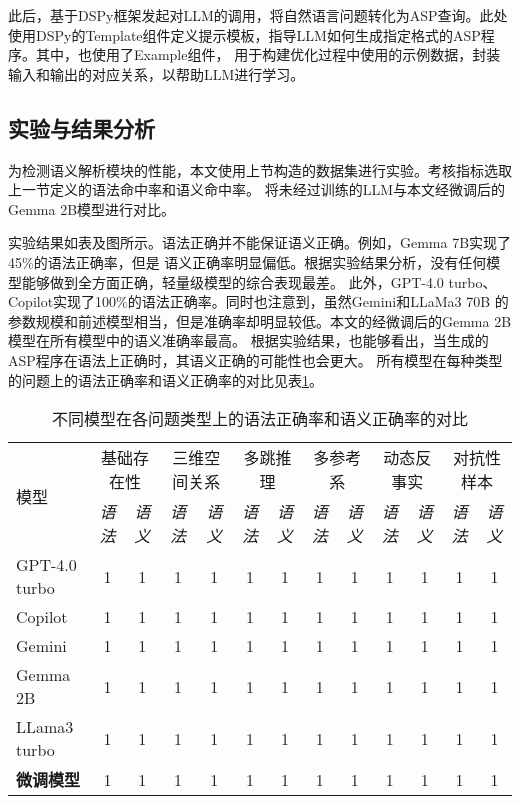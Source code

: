 此后，基于DSPy框架发起对LLM的调用，将自然语言问题转化为ASP查询。此处使用DSPy的Template组件定义提示模板，指导LLM如何生成指定格式的ASP程序。其中，也使用了Example组件，
用于构建优化过程中使用的示例数据，封装输入和输出的对应关系，以帮助LLM进行学习。

\subsection{实验与结果分析}
为检测语义解析模块的性能，本文使用上节构造的数据集进行实验。考核指标选取上一节定义的语法命中率和语义命中率。
将未经过训练的LLM与本文经微调后的Gemma 2B模型进行对比。

实验结果如表及图所示。语法正确并不能保证语义正确。例如，Gemma 7B实现了45\%的语法正确率，但是
语义正确率明显偏低。根据实验结果分析，没有任何模型能够做到全方面正确，轻量级模型的综合表现最差。
此外，GPT-4.0 turbo、Copilot实现了100\%的语法正确率。同时也注意到，虽然Gemini和LLaMa3 70B
的参数规模和前述模型相当，但是准确率却明显较低。本文的经微调后的Gemma 2B模型在所有模型中的语义准确率最高。
根据实验结果，也能够看出，当生成的ASP程序在语法上正确时，其语义正确的可能性也会更大。
所有模型在每种类型的问题上的语法正确率和语义正确率的对比见表\ref{tab:semantics_comparison}。

\begin{table}[h]
    \centering
    \renewcommand{\arraystretch}{1.2}
    \setlength{\tabcolsep}{5pt}
    \begin{tabular}{lcccccccccccc}
        \toprule
        \multirow{2}{*}{模型} & \multicolumn{2}{c}{基础存在性} & \multicolumn{2}{c}{三维空间关系} & \multicolumn{2}{c}{多跳推理} & \multicolumn{2}{c}{多参考系} & \multicolumn{2}{c}{动态反事实} & \multicolumn{2}{c}{对抗性样本} \\
        \cmidrule(lr){2-3} \cmidrule(lr){4-5} \cmidrule(lr){6-7} \cmidrule(lr){8-9} \cmidrule(lr){10-11} \cmidrule(lr){12-13}
        & \textit{语法} & \textit{语义} & \textit{语法} & \textit{语义} & \textit{语法} & \textit{语义} & \textit{语法} & \textit{语义} & \textit{语法} & \textit{语义} & \textit{语法} & \textit{语义} \\
        \midrule
        GPT-4.0 turbo & 1 & 1 & 1 & 1 & 1 & 1 & 1 & 1 & 1 & 1 & 1 & 1 \\
        Copilot & 1 & 1 & 1 & 1 & 1 & 1 & 1 & 1 & 1 & 1 & 1 & 1 \\
        Gemini & 1 & 1 & 1 & 1 & 1 & 1 & 1 & 1 & 1 & 1 & 1 & 1 \\
        Gemma 2B & 1 & 1 & 1 & 1 & 1 & 1 & 1 & 1 & 1 & 1 & 1 & 1 \\
        LLama3 turbo & 1 & 1 & 1 & 1 & 1 & 1 & 1 & 1 & 1 & 1 & 1 & 1 \\
        \midrule
        \textbf{微调模型} & 1 & 1 & 1 & 1 & 1 & 1 & 1 & 1 & 1 & 1 & 1 & 1 \\
        \bottomrule
    \end{tabular}
    \caption{不同模型在各问题类型上的语法正确率和语义正确率的对比}
    \label{tab:semantics_comparison}
\end{table}

